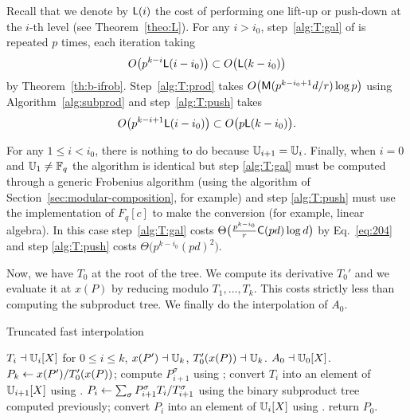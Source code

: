 Recall that we denote by $\mathsf{L}(i)$ the cost of performing one lift-up
or push-down at the $i$-th level (see Theorem~\ref{theo:L}). For any
$i>i_0$, step~\ref{alg:T:gal} of is repeated $p$ times, each iteration
taking 
\[O\bigl(p^{k-i}\mathsf{L}(i-i_0)\bigr) \subset O\bigl(\mathsf{L}(k-i_0)\bigr)\]
by Theorem~\ref{th:b-ifrob}.  Step~\ref{alg:T:prod} takes
$O\bigl(\mathsf{M}(p^{k-i_0+1}d/r)\log p\bigr)$ using
Algorithm~\ref{alg:subprod} and step~\ref{alg:T:push} takes
\[O\bigl(p^{k-i+1}\mathsf{L}(i-i_0)\bigr) \subset
O\bigl(p\mathsf{L}(k-i_0)\bigr)\text{.}\]

For any $1\le i<i_0$, there is nothing to do because
$\mathbb{U}_{i+1}=\mathbb{U}_i$. Finally, when $i=0$ and $\mathbb{U}_1\ne\mathbb{F}_q$ the algorithm
is identical but step \ref{alg:T:gal} must be computed through a
generic Frobenius algorithm (using the algorithm of
Section~\ref{sec:modular-composition}, for example) and step
\ref{alg:T:push} must use the implementation of $F_q[c]$ to make the
conversion (for example, linear algebra). In this case
step~\ref{alg:T:gal} costs
$\Theta\bigl(\frac{p^{k-i_0}}{r}\mathsf{C}(pd)\log d \bigr)$
by Eq.~\eqref{eq:204} and step \ref{alg:T:push} costs
$\Theta\bigl(p^{k-i_0}(pd)^2\bigr)$.

Now, we have $T_0$ at the root of the tree. We compute its derivative
$T_0'$ and we evaluate it at $x(P)$ by reducing modulo
$T_1,\ldots,T_k$. This costs strictly less than computing the
subproduct tree.  We finally do the interpolation of $A_0$.

\begin{algorithm}
  \caption{Truncated fast interpolation}
  \begin{algorithmic}[1]
    \REQUIRE $T_i\dashv\mathbb{U}_i[X]$ for $0\le i\le k$, $x(P')\dashv\mathbb{U}_k$, $T_0'(x(P))\dashv\mathbb{U}_k$.
    \ENSURE $A_0\dashv\mathbb{U}_0[X]$.
    \STATE\label{alg:A}  $P_k \leftarrow x(P')/T_0'(x(P))$;
    \STATE\label{alg:A:gal} compute $P_{i+1}^\sigma$ using \hyperref[alg:iterfrobenius]{};
    \ENDFOR
    \STATE\label{alg:T:lift} convert $T_i$ into an element of $\mathbb{U}_{i+1}[X]$ using \hyperref[alg:liftup]{}.
    \STATE\label{alg:A:CRA} $P_i\leftarrow \sum_{\sigma}P_{i+1}^\sigma T_i/T_{i+1}^\sigma$ using the binary subproduct tree computed previously;
    \STATE\label{alg:A:push} convert  $P_i$ into an element of
    $\mathbb{U}_i[X]$ using \hyperref[alg:push-down]{}.
    \ENDFOR
    \STATE return $P_0$.
  \end{algorithmic}
\end{algorithm}

